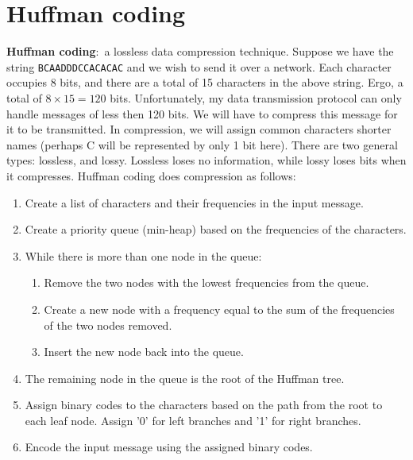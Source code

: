 \documentclass[nobib]{tufte-handout}
\newcommand{\defn}[2]{\noindent\textbf{#1}:\ #2}
\begin{document}
\section{Huffman coding}
\defn{Huffman coding}{a lossless data compression technique}. 
Suppose we have the string \texttt{BCAADDDCCACACAC} and we wish 
to send it over a network. Each character occupies 8 bits, and there 
are a total of 15 characters in the above string. Ergo, 
a total of $8 \times 15 = 120$ bits. 
Unfortunately, my data transmission protocol can only handle 
messages of less then 120 bits. We will have to compress this message 
for it to be transmitted. 
In compression, we will assign common characters shorter names 
(perhaps C will be represented by only 1 bit here). There 
are two general types: lossless, and lossy. Lossless loses no 
information, while lossy loses bits when it compresses. 
Huffman coding does compression as follows: 
\begin{enumerate}
   \item Create a list of characters and their frequencies in the input message.
   \item Create a priority queue (min-heap) based on the frequencies of the characters.
   \item While there is more than one node in the queue:
   \begin{enumerate}
      \item Remove the two nodes with the lowest frequencies from the queue.
      \item Create a new node with a frequency equal to the sum of the frequencies of the two nodes removed.
      \item Insert the new node back into the queue.
   \end{enumerate}
   \item The remaining node in the queue is the root of the Huffman tree.
   \item Assign binary codes to the characters based on the path from the root to each leaf node. Assign '0' for left branches and '1' for right branches.
   \item Encode the input message using the assigned binary codes.
\end{enumerate}
\end{document}
